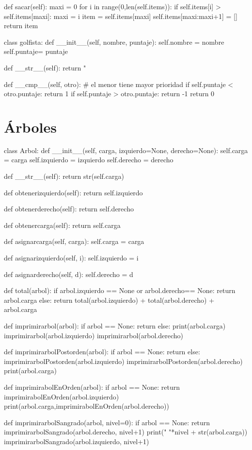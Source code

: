 \begin{pythoncode}
  def sacar(self):
    maxi = 0
    for i in range(0,len(self.items)): 
      if self.items[i] > self.items[maxi]:
    maxi = i
      item = self.items[maxi]
      self.items[maxi:maxi+1] = []
      return item


class golfista:
  def __init__(self, nombre, puntaje):
    self.nombre = nombre
    self.puntaje= puntaje
    
  def __str__(self):
    return "%

  def __cmp__(self, otro):
    # el menor tiene mayor prioridad
    if self.puntaje < otro.puntaje: return 1
      if self.puntaje > otro.puntaje: return -1
        return 0
\end{pythoncode}

\section{Árboles}

\begin{pythoncode}
class Arbol:
  def __init__(self, carga, izquierdo=None, derecho=None):
    self.carga = carga
    self.izquierdo = izquierdo
    self.derecho = derecho
      
  def __str__(self):
    return str(self.carga)
  
  def obtenerizquierdo(self):
    return self.izquierdo
  
  def obtenerderecho(self):
    return self.derecho
  
  def obtenercarga(self):
    return self.carga
    
  def asignarcarga(self, carga):
    self.carga = carga
  
  def asignarizquierdo(self, i):
    self.izquierdo = i
    
  def asignarderecho(self, d):
    self.derecho = d

def total(arbol):
  if arbol.izquierdo == None or arbol.derecho== None:
    return arbol.carga
  else:
    return total(arbol.izquierdo) + total(arbol.derecho) + 
             arbol.carga
   
def imprimirarbol(arbol):
  if arbol == None:
    return 
  else:
    print(arbol.carga)
    imprimirarbol(arbol.izquierdo)
    imprimirarbol(arbol.derecho)

def imprimirarbolPostorden(arbol):
  if arbol == None:
    return
  else:
    imprimirarbolPostorden(arbol.izquierdo)
    imprimirarbolPostorden(arbol.derecho)
    print(arbol.carga)   

def imprimirabolEnOrden(arbol):
  if arbol == None:
    return
  imprimirabolEnOrden(arbol.izquierdo)
  print(arbol.carga,imprimirabolEnOrden(arbol.derecho))

def imprimirarbolSangrado(arbol, nivel=0):
  if arbol == None:
    return
  imprimirarbolSangrado(arbol.derecho, nivel+1)
  print(" "*nivel + str(arbol.carga))
  imprimirarbolSangrado(arbol.izquierdo, nivel+1)
\end{pythoncode}

